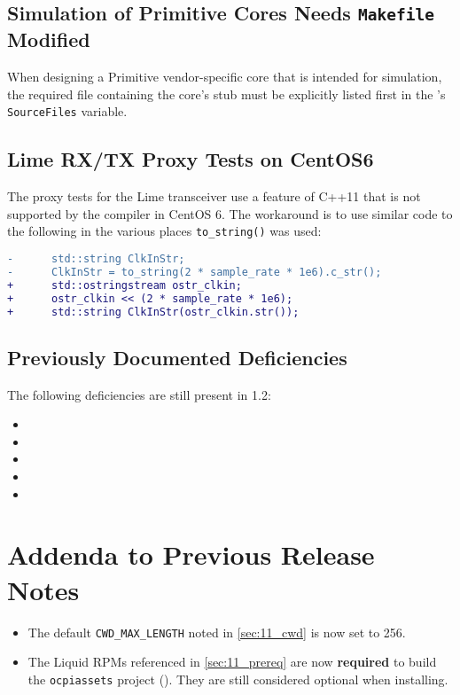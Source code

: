 \subsection{Simulation of Primitive Cores Needs \texttt{Makefile} Modified} %
\label{bug:3170}
When designing a Primitive vendor-specific core that is intended for simulation, the required  file containing the core's stub must be explicitly listed first in the 's \texttt{SourceFiles} variable.

\subsection{Lime RX/TX Proxy Tests on CentOS6} %
\label{bug:3193}
The proxy tests for the Lime transceiver use a feature of C++11 that is not supported by the compiler in CentOS 6. The workaround is to use similar code to the following in the various places \verb+to_string()+ was used:
\begin{lstlisting}[language=diff]
-      std::string ClkInStr;
-      ClkInStr = to_string(2 * sample_rate * 1e6).c_str();
+      std::ostringstream ostr_clkin;
+      ostr_clkin << (2 * sample_rate * 1e6);
+      std::string ClkInStr(ostr_clkin.str());
\end{lstlisting}

\subsection{Previously Documented Deficiencies}
The following deficiencies are still present in 1.2:
\begin{itemize}
\setlength\itemsep{0em} %
\item {}
\item {}
\item {}
\item {}
\item {}
\end{itemize}

\section{Addenda to Previous Release Notes}
\begin{itemize}
\setlength\itemsep{0em} %
\item The default \texttt{CWD\_MAX\_LENGTH} noted in \ref{sec:11_cwd} is now set to 256. %
\item The Liquid RPMs referenced in \ref{sec:11_prereq} are now \textbf{required} to build the \texttt{ocpiassets} project (). They are still considered optional when installing.
\end{itemize}

